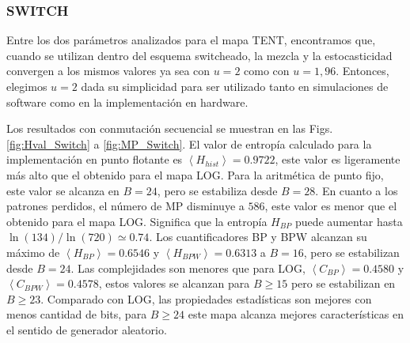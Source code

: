 \subsubsection{SWITCH} \label{sssec:switch}

Entre los dos parámetros analizados para el mapa TENT, encontramos que, cuando se utilizan dentro del esquema switcheado, la mezcla y la estocasticidad convergen a los mismos valores ya sea con $u=2$ como con $u=1,96$.
Entonces, elegimos $u=2$ dada su simplicidad para ser utilizado tanto en simulaciones de software como en la implementación en hardware.

Los resultados con conmutación secuencial se muestran en las Figs. \ref{fig:Hval_Switch} a \ref{fig:MP_Switch}.
El valor de entropía calculado para la implementación en punto flotante es $\left \langle H_{hist} \right \rangle = 0.9722$, este valor es ligeramente más alto que el obtenido para el mapa LOG.
Para la aritmética de punto fijo, este valor se alcanza en $B = 24$, pero se estabiliza desde $B = 28$.
En cuanto a los patrones perdidos, el número de MP disminuye a $586$, este valor es menor que el obtenido para el mapa LOG.
Significa que la entropía $H_{BP}$ puede aumentar hasta $\ln(134) / \ln(720) \simeq 0.74$.
Los cuantificadores BP y BPW alcanzan su máximo de $\left \langle H_{BP} \right \rangle = 0.6546$ y $\left \langle H_{BPW} \right \rangle = 0.6313$ a $B = 16$, pero se estabilizan desde $B = 24$.
Las complejidades son menores que para LOG, $\left \langle C_{BP} \right \rangle = 0.4580$ y $\left \langle C_{BPW} \right \rangle = 0.4578$, estos valores se alcanzan para $B \geq 15$ pero se estabilizan en $B \geq 23$.
Comparado con LOG, las propiedades estadísticas son mejores con menos cantidad de bits, para $B \geq 24$ este mapa alcanza mejores características en el sentido de generador aleatorio.

